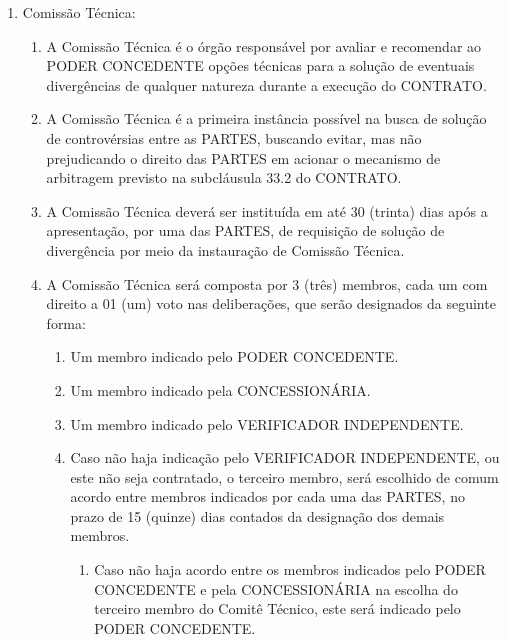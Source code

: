 \documentclass[a4paper,11pt]{report} %
\begin{document}
\begin{enumerate}
\item \label{itm:KG7D} Comissão Técnica:

\begin{enumerate}[label*=\arabic*.]
\item \label{itm:BNLJ} A Comissão Técnica é o órgão responsável por avaliar e recomendar ao PODER CONCEDENTE opções técnicas para a solução de eventuais divergências de qualquer natureza durante a execução do CONTRATO.

\item \label{itm:WH62} A Comissão Técnica é a primeira instância possível na busca de solução de controvérsias entre as PARTES, buscando evitar, mas não prejudicando o direito das PARTES em acionar o mecanismo de arbitragem previsto na subcláusula 33.2 do CONTRATO.

\item \label{itm:MC2Q} A Comissão Técnica deverá ser instituída em até 30 (trinta) dias após a apresentação, por uma das PARTES, de requisição de solução de divergência por meio da instauração de Comissão Técnica.

\item \label{itm:2448} A Comissão Técnica será composta por 3 (três) membros, cada um com direito a 01 (um) voto nas deliberações, que serão designados da seguinte forma:

\begin{enumerate}[label*=\arabic*.]
\item \label{itm:3A26} Um membro indicado pelo PODER CONCEDENTE.

\item \label{itm:5WR9} Um membro indicado pela CONCESSIONÁRIA.

\item \label{itm:JQYB} Um membro indicado pelo VERIFICADOR INDEPENDENTE.

\item \label{itm:6DL5} Caso não haja indicação pelo VERIFICADOR INDEPENDENTE, ou este não seja contratado, o terceiro membro, será escolhido de comum acordo entre membros indicados por cada uma das PARTES, no prazo de 15 (quinze) dias contados da designação dos demais membros.

\begin{enumerate}[label*=\arabic*.]
\item \label{itm:5TWV} Caso não haja acordo entre os membros indicados pelo PODER CONCEDENTE e pela CONCESSIONÁRIA na escolha do terceiro membro do Comitê Técnico, este será indicado pelo PODER CONCEDENTE.
\end{enumerate}
\end{enumerate}


\end{enumerate}
\end{enumerate}
\end{document}
